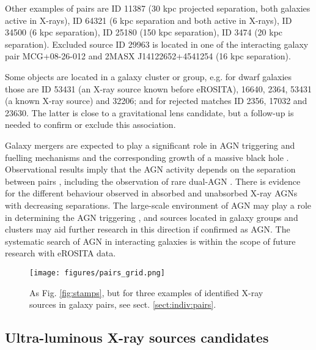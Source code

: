 \documentclass[fleqn,usenatbib]{mnras}
\newcommand{\sbyk}[1]{\textcolor{OliveGreen}{{SB: \bf||#1||}}}
\begin{document}
Other examples of pairs are ID 11387 (30 kpc projected separation, both galaxies active in X-rays), ID 64321 (6 kpc separation and both  active in X-rays), ID 34500 (6 kpc separation),  ID 25180 (150 kpc separation), ID 3474 (20 kpc separation). Excluded source ID 29963 is located in one of the interacting galaxy pair MCG+08-26-012 and 2MASX J14122652+4541254 (16 kpc separation). %


Some objects are located in a galaxy cluster or group, e.g. for dwarf galaxies those are ID 53431 (an X-ray source known before eROSITA), 16640, 2364, 53431 (a known X-ray source) and 32206; and for rejected matches ID 2356, 17032 and 23630. The latter is close to a gravitational lens candidate, but a follow-up is needed to confirm or exclude this association. 

Galaxy mergers are expected to play a significant role in AGN triggering and fuelling mechanisms and the corresponding growth of a massive black hole \citep{Mayer2010, Allevato2016}. Observational results imply that the AGN activity depends on the separation between pairs  \citep{Satyapal2014, Fu2018, Dougherty2023}, including the observation of rare dual-AGN \citep{McGurk2015}. There is evidence for the different behaviour observed in absorbed and unabsorbed X-ray AGNs \citep{Guainazzi2021} with decreasing separations. The  large-scale environment of AGN may play a role in determining the AGN triggering \citep{Hopkins2014, Allevato2016}, and  sources located in galaxy groups and clusters may aid further research in this direction if confirmed as AGN. The systematic search of AGN in interacting galaxies is within the scope of future research with eROSITA data.

\begin{figure*}
    \centering
    \texttt{[image: figures/pairs\_grid.png]}
    \caption[As Fig. \ref{fig:stamps}, but for galaxy pairs.]{As Fig. \ref{fig:stamps}, but for three examples of identified X-ray sources in  galaxy pairs, see sect. \ref{sect:indiv:pairs}. }
    \label{fig:stamps-pairs}
\end{figure*}


    
\subsection{Ultra-luminous X-ray sources candidates}
\label{sect:indiv:ulx}
\end{document}
